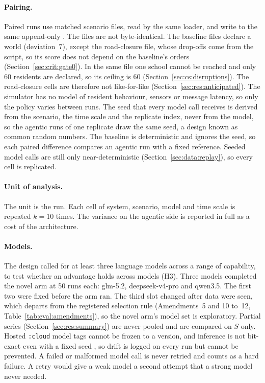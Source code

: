 \paragraph{Pairing.} Paired runs use matched scenario
files, read by the same loader, and write to the same append-only
. The files are not byte-identical. The baseline files declare
a world (deviation~7), except the road-closure file, whose drop-offs come
from the script, so its score does not depend on the baseline's orders
(Section~\ref{sec:crit:gate0}). In the
same file one school cannot be reached and only 60 residents are declared, so
its ceiling is 60
(Section~\ref{sec:cs:disruptions}). The road-closure cells are therefore not
like-for-like (Section~\ref{sec:res:anticipated}). The simulator has no model of resident behaviour, sensors or
message latency, so only the policy varies between runs. The seed that every model call
receives is derived
from the scenario, the time scale and the replicate index, never from the
model, so the agentic runs of one replicate draw the same seed, a design known
as common random numbers. The baseline is deterministic and ignores the seed,
so each paired difference compares an agentic run with a fixed reference. Seeded model calls are still only
near-deterministic (Section~\ref{sec:data:replay}), so every cell is
replicated.

\paragraph{Unit of analysis.} The unit is the run. Each cell of system,
scenario, model and time scale is repeated $k = 10$ times. The
variance on the agentic side is reported in full as a cost of the
architecture.

\paragraph{Models.} The design called for at least three language models
across a range of capability, to test whether an advantage holds across models
(H3). Three models completed the novel arm at 50 runs each: glm-5.2,
deepseek-v4-pro and qwen3.5. The first two were fixed before the arm ran. The
third slot changed after data were seen, which departs from the registered
selection rule (Amendments~5 and 10 to~12, Table~\ref{tab:eval:amendments}),
so the novel arm's model set is exploratory. Partial series
(Section~\ref{sec:res:summary}) are never pooled and are compared on $S$ only.
Hosted \texttt{:cloud} model tags cannot be frozen to a version, and inference
is not bit-exact even with a fixed seed \parencite{yuan2025}, so drift is
logged on every run but cannot be prevented. A failed or malformed model call is never retried and
counts as a hard failure. A retry would give a weak model a second attempt that
a strong model never needed.

